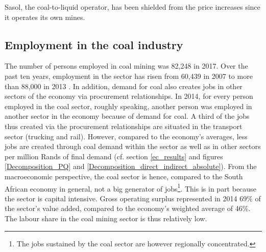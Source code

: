 \documentclass[12pt,english]{article}
\newcommand\lies[2][]{\todo[color=orange!50,#1]{ldf: #2}}
\begin{document}
Sasol, the coal-to-liquid operator, has been shielded from the price increases since it operates its own mines. %

\subsection{Employment in the coal industry} \label{section_empl_coal}

The number of persons employed in coal mining was 82,248 in 2017.  Over the past ten years, employment in the sector has risen from 60,439 in 2007 to more than 88,000 in 2013 . In addition, demand for coal also creates jobs in other sectors of the economy via procurement relationships. In 2014, for every person employed in the coal sector, roughly speaking, another person was employed in another sector in the economy because of demand for coal. A third of the jobs thus created via the procurement relationships are situated in the transport sector (trucking and rail). However, compared to the economy's averages, less jobs are created through coal demand within the sector as well as in other sectors per million Rands of final demand (cf. section \ref{ec_results} and figures \ref{Decomposition_PQ} and \ref{Decomposition_direct_indirect_absolute}). %
From the macroeconomic perspective, the coal sector is hence, compared to the South African economy in general, not a big generator of jobs\footnote{The jobs sustained by the coal sector are however regionally concentrated.}. This is in part because the sector is capital intensive. Gross operating surplus represented in 2014 $69\%$ of the sector's value added, compared to the economy's weighted average of 46\%. The labour share in the coal mining sector is thus relatively low.
\end{document}
